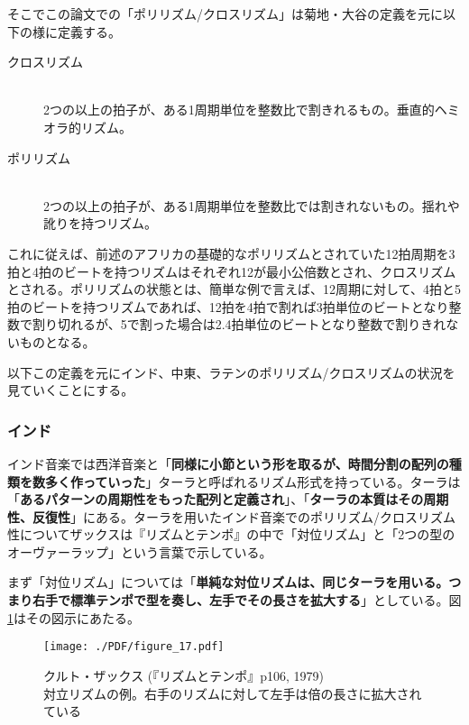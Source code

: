 \documentclass[uplatex,dvipdfmx]{ujarticle}
\begin{document}
そこでこの論文での「ポリリズム/クロスリズム」は菊地・大谷の定義を元に以下の様に定義する。

\begin{description}
 \item[クロスリズム]\mbox{}\\
	    2つの以上の拍子が、ある1周期単位を整数比で割きれるもの。垂直的ヘミオラ的リズム。
 \item[ポリリズム]\mbox{}\\
	    2つの以上の拍子が、ある1周期単位を整数比では割きれないもの。揺れや訛りを持つリズム。
\end{description}

これに従えば、前述のアフリカの基礎的なポリリズムとされていた12拍周期を3拍と4拍のビートを持つリズムはそれぞれ12が最小公倍数とされ、クロスリズムとされる。ポリリズムの状態とは、簡単な例で言えば、12周期に対して、4拍と5拍のビートを持つリズムであれば、12拍を4拍で割れば3拍単位のビートとなり整数で割り切れるが、5で割った場合は2.4拍単位のビートとなり整数で割りきれないものとなる。

以下この定義を元にインド、中東、ラテンのポリリズム/クロスリズムの状況を見ていくことにする。

\subsubsection{インド}

インド音楽では西洋音楽と「{\bf 同様に小節という形を取るが、時間分割の配列の種類を数多く作っていった}」\cite{deva:01}ターラと呼ばれるリズム形式を持っている。ターラは「{\bf あるパターンの周期性をもった配列と定義され}」\cite{deva:01}、「{\bf ターラの本質はその周期性、反復性}」\cite{deva:01}にある。ターラを用いたインド音楽でのポリリズム/クロスリズム性についてザックスは『リズムとテンポ』の中で「対位リズム」と「2つの型のオーヴァーラップ」という言葉で示している。

まず「対位リズム」については「{\bf 単純な対位リズムは、同じターラを用いる。つまり右手で標準テンポで型を奏し、左手でその長さを拡大する}」\cite{sachs:01}としている。図\ref{fig:figure_17}はその図示にあたる。

\begin{figure}[ht]
\centerline{
	\texttt{[image: ./PDF/figure\_17.pdf]}
}
\caption{クルト・ザックス (『リズムとテンポ』p106, 1979)\\
対立リズムの例。右手のリズムに対して左手は倍の長さに拡大されている}
\label{fig:figure_17}
\end{figure}
\end{document}
